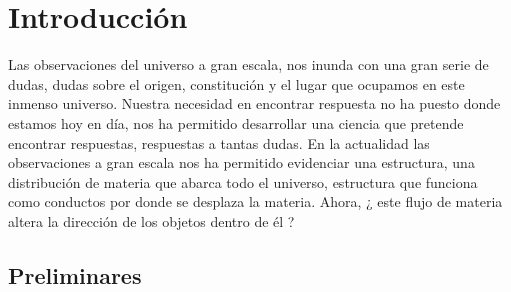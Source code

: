 



\chapter{Introducción}
\label{cha:Introduction}

Las observaciones del universo a gran escala, nos inunda con una gran serie de dudas, dudas sobre el origen, constitución y el lugar que ocupamos en este inmenso universo. Nuestra necesidad en encontrar respuesta no ha puesto donde estamos hoy en día, nos ha permitido desarrollar una ciencia que pretende encontrar respuestas, respuestas a tantas dudas. En la actualidad las observaciones a gran escala nos ha permitido evidenciar una estructura, una distribución de materia que abarca todo el universo, estructura que funciona como conductos por donde se desplaza la materia. Ahora, ¿ este flujo de materia altera la dirección de los objetos dentro de él ?
 
\section{Preliminares }
\label{sec: prelimenares}
 
